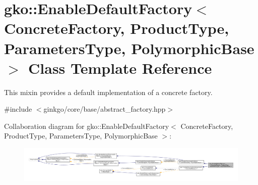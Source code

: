 \hypertarget{classgko_1_1EnableDefaultFactory}{}\section{gko\+:\+:Enable\+Default\+Factory$<$ Concrete\+Factory, Product\+Type, Parameters\+Type, Polymorphic\+Base $>$ Class Template Reference}
\label{classgko_1_1EnableDefaultFactory}


This mixin provides a default implementation of a concrete factory.  




{\ttfamily \#include $<$ginkgo/core/base/abstract\+\_\+factory.\+hpp$>$}



Collaboration diagram for gko\+:\+:Enable\+Default\+Factory$<$ Concrete\+Factory, Product\+Type, Parameters\+Type, Polymorphic\+Base $>$\+:
\nopagebreak
\begin{figure}[H]
\begin{center}
\leavevmode
\includegraphics[width=350pt]{classgko_1_1EnableDefaultFactory__coll__graph}
\end{center}
\end{figure}
